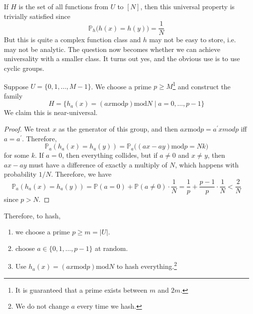   If $H$ is the set of all functions from $U$ to $[N]$, then this universal property is trivially satisfied since 
  \begin{equation}
      \mathbb{P}_{h} \big( h(x) = h(y) \big) = \frac{1}{N}
  \end{equation}
  But this is quite a complex function class and $h$ may not be easy to store, i.e. may not be analytic. The question now becomes whether we can achieve universality with a smaller class. It turns out yes, and the obvious use is to use cyclic groups. 

  \begin{lemma}
    Suppose $U = \{0, 1, \ldots, M-1\}$. We choose a prime $p \geq M$\footnote{It is guaranteed that a prime exists between $m$ and $2m$.} and construct the family 
    \begin{equation}
      H = \{h_a (x) = (ax \mathrm{ mod } p ) \mathrm{ mod } N \mid a = 0, \ldots, p-1 \}
    \end{equation}
    We claim this is near-universal. 
  \end{lemma}
  \begin{proof}
    We treat $x$ as the generator of this group, and then $ax \mathrm{ mod } p = a^\prime x { mod } p$ iff $a = a^\prime$. Therefore, 
    \begin{equation}
      \mathbb{P}_a (h_a (x) = h_a (y)) = \mathbb{P}_a \big( (ax - ay) \mathrm{ mod } p = N k \big)
    \end{equation}
    for some $k$. If $a = 0$, then everything collides, but if $a \neq 0$ and $x \neq y$, then $ax - ay$ must have a difference of exactly a multiply of $N$, which happens with probability $1/N$. Therefore, we have 
    \begin{equation}
      \mathbb{P}_a (h_a (x) = h_a (y)) = \mathbb{P}(a = 0) + \mathbb{P}(a \neq 0) \cdot \frac{1}{N} = \frac{1}{p} + \frac{p-1}{p} \cdot \frac{1}{N} < \frac{2}{N} 
    \end{equation}
    since $p > N$. 
  \end{proof}

  Therefore, to hash, 
  \begin{enumerate}
    \item we choose a prime $p \geq m = |U|$. 
    \item choose $a \in \{0, 1, \ldots, p-1\}$ at random. 
    \item Use $h_a(x) = (ax \mathrm{ mod } p ) \mathrm{ mod } N$ to hash everything.\footnote{We do not change $a$ every time we hash. }
  \end{enumerate}

